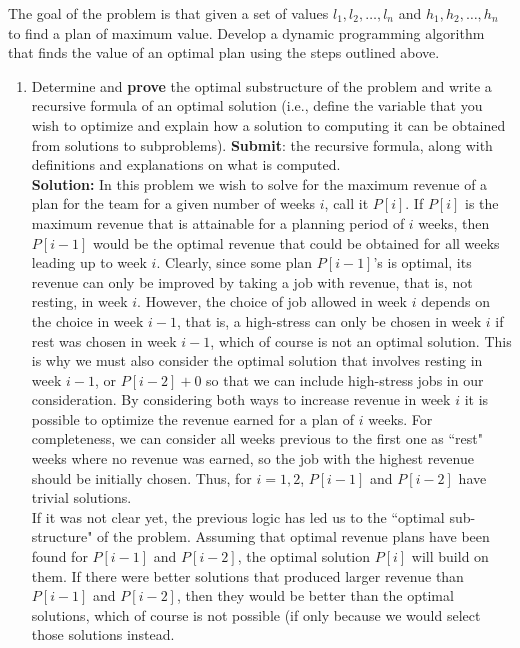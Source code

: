 \documentclass[11pts]{article}
\begin{document}
\begin{enumerate}
      The goal of the problem is that given a set of values
      $l_1, l_2, \dots, l_n$
      and $h_1, h_2, \dots, h_n$ to find a plan of maximum value. Develop a
      dynamic programming algorithm that finds the value of an optimal
      plan using the steps outlined above. \\ 

  \begin{enumerate}
  \item Determine and \textbf{prove} the optimal substructure of the problem and
        write a recursive formula of an optimal solution (i.e., define
        the variable that you wish to optimize and explain how a solution
        to computing it can be obtained from solutions to subproblems).
        \textbf{Submit}: the recursive formula, along with definitions and
        explanations on what is computed. \\

  \textbf{Solution:} In this problem we wish to solve for the maximum revenue
  of a plan for the team for a given number of weeks $i$,
  call it $P[i]$. If $P[i]$ is
  the maximum revenue that is attainable for a planning period of $i$ weeks,
  then $P[i-1]$ would be the optimal revenue that could be obtained for all
  weeks leading up to week $i$. Clearly, since some plan $P[i-1]$'s is optimal,
  its revenue
  can only be improved by taking a job with revenue, that is, not resting,
  in week $i$. However, the choice of job allowed in week $i$ depends on the
  choice in week $i-1$, that is, a high-stress can only be chosen in week
  $i$ if rest was chosen in week $i-1$, which of course is not an optimal
  solution. This is why we must also consider the optimal solution that
  involves resting in week $i-1$, or $P[i-2] + 0$ so that we can include
  high-stress jobs in our consideration. By considering both ways to
  increase revenue in week $i$ it is possible to optimize the revenue
  earned for a plan of $i$ weeks. For completeness, we can consider all
  weeks previous to the first one as ``rest" weeks where no revenue was
  earned, so the job with the highest revenue should be initially chosen.
  Thus, for $i=1, 2$, $P[i-1]$ and $P[i-2]$ have trivial solutions. \\

  If it was not clear yet, the previous logic has led us to the
  ``optimal sub-structure" of the problem. Assuming that optimal
  revenue plans have been found for $P[i-1]$ and $P[i-2]$, the
  optimal solution $P[i]$ will build on them. If there were better
  solutions that produced larger revenue than $P[i-1]$ and $P[i-2]$,
  then they would be better than the optimal solutions, which of course
  is not possible (if only because we would select those solutions instead.


\end{enumerate}
\end{enumerate}
\end{document}
